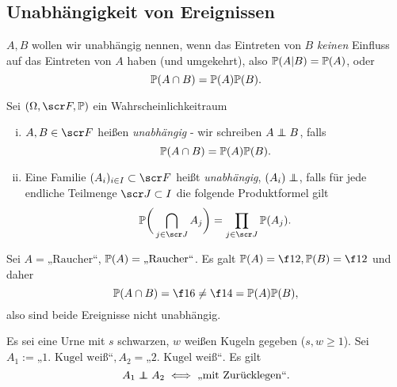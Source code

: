 \subsection{Unabhängigkeit von Ereignissen}

$A, B$ wollen wir unabhängig nennen, wenn das Eintreten von $B$ \emph{keinen} Einfluss auf das Eintreten von $A$ haben (und umgekehrt), also $\P(A | B) = \P(A)$, oder
\[
	\P(A \cap B) = \P(A) \P(B).
\]


\begin{df} \label{1.5.7}
	Sei $(\Omega, \scr F, \P)$ ein Wahrscheinlichkeitraum
	\begin{enumerate}[(i)]
		\item
			$A, B \in \scr F$ heißen \emph{unabhängig} - wir schreiben $A \indep B$, falls
			\[
				\P(A \cap B) = \P(A) \P(B).
			\]
		\item
			Eine Familie $(A_i)_{i\in I} \subset \scr F$ heißt \emph{unabhängig}, $(A_i) \indep$, falls für jede endliche Teilmenge $\scr J \subset I$ die folgende Produktformel gilt
			\[
				\P\bigg(\bigcap_{j\in \scr J} A_j \bigg)
				= \prod_{j\in \scr J} \P(A_j).
			\]
	\end{enumerate}
\end{df}

\begin{ex} \label{1.5.8}
	Sei $A = \text{„Raucher“}$, $\P(A) = \text{„Raucher“}$.
	Es galt $\P(A) = \f 12, \P(B) = \f 12$ und daher
	\[
		\P(A \cap B) = \f 16 \neq \f 14 = \P(A) \P(B),
	\]
	also sind beide Ereignisse nicht unabhängig.
\end{ex}

\begin{ex} \label{1.5.9}
	Es sei eine Urne mit $s$ schwarzen, $w$ weißen Kugeln gegeben ($s, w \ge 1$).
	Sei $A_1 := \text{„1. Kugel weiß“}, A_2 = \text{„2. Kugel weiß“}$.
	Es gilt
	\[
		A_1 \indep A_2
		\iff
		\text{„mit Zurücklegen“}.
	\]
\end{ex}

